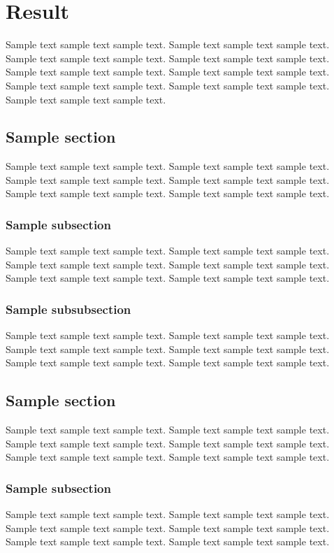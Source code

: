 \chapter{Result}

Sample text sample text sample text. Sample text sample text sample text.
Sample text sample text sample text. Sample text sample text sample text.
Sample text sample text sample text. Sample text sample text sample text.
Sample text sample text sample text. Sample text sample text sample text.
Sample text sample text sample text. \cite{Grosz_and_Sidner_1986}

\section{Sample section}
Sample text sample text sample text. Sample text sample text sample text.
Sample text sample text sample text. Sample text sample text sample text.
Sample text sample text sample text. Sample text sample text sample text.

\subsection{Sample subsection}
Sample text sample text sample text. Sample text sample text sample text.
Sample text sample text sample text. Sample text sample text sample text.
Sample text sample text sample text. Sample text sample text sample text.

\subsection{Sample subsubsection}
Sample text sample text sample text. Sample text sample text sample text.
Sample text sample text sample text. Sample text sample text sample text.
Sample text sample text sample text. Sample text sample text sample text.

\section{Sample section}
Sample text sample text sample text. Sample text sample text sample text.
Sample text sample text sample text. Sample text sample text sample text.
Sample text sample text sample text. Sample text sample text sample text.

\subsection{Sample subsection}
Sample text sample text sample text. Sample text sample text sample text.
Sample text sample text sample text. Sample text sample text sample text.
Sample text sample text sample text. Sample text sample text sample text.
